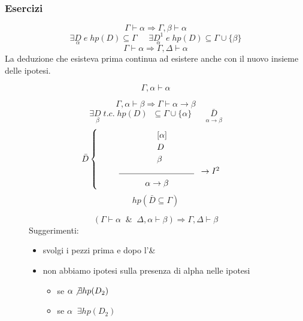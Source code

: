 \documentclass{article}
\theoremstyle{break}
\theoremstyle{break}
\theoremstyle{break}
\theoremstyle{break}
\begin{document}
    \subsubsection{Esercizi}
\begin{exercise}
    \[
    \Gamma \vdash \alpha \Rightarrow \Gamma,\beta \vdash \alpha
    \] 
    \[
        \exists \underset{\alpha}{D}\; e\; hp(D) \subseteq \Gamma \;\;\;\;\; \exists \underset{\alpha}{D^1} \; e \; hp(D) \subseteq \Gamma \cup \{\beta\} 
    \] 
    \[
    \Gamma \vdash \alpha \Rightarrow \Gamma, \Delta \vdash \alpha
    \] 
    La deduzione che esisteva prima continua ad esistere anche con il nuovo insieme delle ipotesi.
\end{exercise}
\begin{exercise}[a casa]
    \[
    \Gamma, \alpha \vdash \alpha
    \] 
\end{exercise}
\begin{exercise}
    \[
    \Gamma,\alpha \vdash \beta \Rightarrow \Gamma \vdash \alpha \to \beta
    \] 
\[
    \exists \underset{\beta}{D}\; t.c.\; hp(D)\;\; \subseteq \Gamma \cup \{\alpha\} \;\;\;\;\;\; \bar{\underset{\alpha \to \beta}{D}} 
\] 
\[
    \bar{D} \begin{cases}
        \hspace{2.5cm}[\alpha]\\
        \hspace{2.5cm}D\\
        \hspace{2.5cm}\beta\\
        \hspace{0.9cm}\line(1,0){90}\;\;\; \to I^2 \\  
        \hspace{2cm}\alpha \to \beta
    \end{cases}
\] 
\[
    hp(\bar{D} \subseteq \Gamma)
\] 
\end{exercise}
\begin{figure}[H]
    \begin{exercise}[a casa]
        \[
            (\Gamma \vdash \alpha\;\; \&\;\; \Delta, \alpha \vdash \beta) \Rightarrow \Gamma, \Delta \vdash \beta
        \] 
        Suggerimenti:
        \begin{itemize}
            \item svolgi i pezzi prima e dopo l'\&
            \item non abbiamo ipotesi sulla presenza di alpha nelle ipotesi
                \begin{itemize}
                    \item se \( \alpha \not\exists hp(D_2)  \) 
                    \item se \( \alpha\;\; \exists hp(D_2)  \) 
                \end{itemize}
        \end{itemize}

    \end{exercise}
\end{figure}
\end{document}
